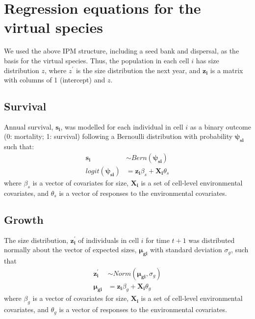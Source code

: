\documentclass[]{article}
\begin{document}
\newpage
\section{Regression equations for the virtual species}

We used the above IPM structure, including a seed bank and dispersal, as
the basis for the virtual species. Thus, the population in each cell
\(i\) has size distribution \(z\), where \(z^{\prime}\) is the size
distribution the next year, and \(\boldsymbol{z_i}\) is a matrix with
columns of 1 (intercept) and \(z\).

\subsection{Survival}

Annual survival, \(\boldsymbol{s_i}\), was modelled for each individual
in cell \(i\) as a binary outcome (0: mortality; 1: survival) following
a Bernoulli distribution with probability \(\boldsymbol{\psi_{si}}\)
such that: \begin{align}
\boldsymbol{s_i} & \sim Bern(\boldsymbol{\psi_{si}}) \\
logit(\boldsymbol{\psi_{si}}) & = \boldsymbol{z_i}\beta_{s} + \boldsymbol{X_i}\theta_{s}
\end{align} where \(\beta_{s}\) is a vector of covariates for size,
\(\boldsymbol{X_i}\) is a set of cell-level environmental covariates,
and \(\theta_{s}\) is a vector of responses to the environmental
covariates.

\subsection{Growth}

The size distribution, \(\boldsymbol{z^{\prime}_i}\) of individuals in
cell \(i\) for time \(t+1\) was distributed normally about the vector of
expected sizes, \(\boldsymbol{\mu_{gi}}\) with standard deviation
\(\sigma_g\), such that \begin{align}
\boldsymbol{z^{\prime}_i} &\sim Norm(\boldsymbol{\mu_{gi}}, \sigma_g) \\
\boldsymbol{\mu_{gi}} &= \boldsymbol{z_i}\beta_{g} + \boldsymbol{X_i}\theta_{g}
\end{align} where \(\beta_{g}\) is a vector of covariates for size,
\(\boldsymbol{X_i}\) is a set of cell-level environmental covariates,
and \(\theta_{g}\) is a vector of responses to the environmental
covariates.
\end{document}
